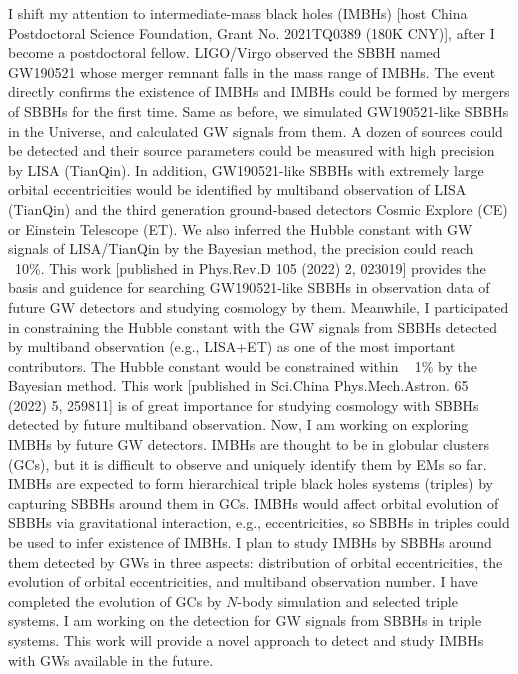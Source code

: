 \documentclass[12pt,a4paper,sans]{article}%
\begin{document}
I shift my attention to intermediate-mass black holes (IMBHs) [host China Postdoctoral Science Foundation, Grant No. 2021TQ0389 (180K CNY)], after I become a postdoctoral fellow. LIGO/Virgo observed the SBBH named
GW190521 whose merger remnant falls in the mass range of IMBHs. The event directly confirms the existence of
IMBHs and IMBHs could be formed by mergers of SBBHs for the first time. Same as before, we simulated GW190521-like SBBHs in the
Universe, and calculated GW signals from them. A dozen of sources could be detected and their source
parameters could be measured with high precision by LISA (TianQin). In addition, GW190521-like SBBHs with extremely large orbital
eccentricities would be identified by
multiband observation of LISA (TianQin) and the third generation ground-based detectors Cosmic Explore (CE) or Einstein
Telescope (ET). We also inferred the Hubble constant with GW signals of LISA/TianQin by the Bayesian method, the precision could reach
~10\%. This work [published in Phys.Rev.D 105 (2022) 2, 023019] provides
the basis and guidence for searching GW190521-like SBBHs in observation data of future GW detectors and studying
cosmology by them. Meanwhile, I participated in constraining the Hubble
constant with the GW signals from SBBHs detected by multiband observation (e.g., LISA+ET) as one of the most important
contributors. The Hubble constant would be constrained within ~ 1\% by the Bayesian method. This work [published in Sci.China Phys.Mech.Astron. 65 (2022) 5, 259811] is of great
importance for studying cosmology with SBBHs detected by future multiband observation. Now, I am working on
exploring IMBHs by future GW detectors. IMBHs are thought to be in globular clusters (GCs), but it is difficult to observe and uniquely
identify them by EMs so far. IMBHs are expected to form hierarchical triple black holes systems (triples) by capturing SBBHs around them
in GCs. IMBHs would affect orbital evolution of SBBHs via gravitational interaction, e.g., eccentricities, so SBBHs in
triples could be used to infer existence of IMBHs. I plan to study IMBHs by SBBHs around them detected by GWs in three aspects: distribution of orbital
eccentricities, the evolution of orbital eccentricities, and multiband observation number. I have completed the evolution of
GCs by $N$-body simulation and selected triple systems. I am working on the detection for 
GW signals from SBBHs in triple systems. This work will provide a novel
approach to detect and study IMBHs with GWs available in the future.
\end{document}
